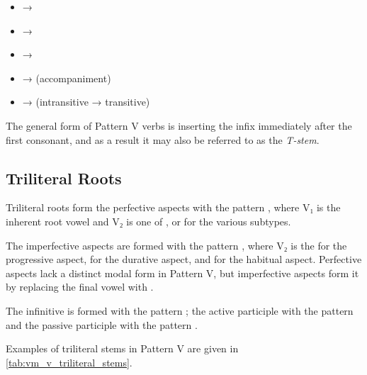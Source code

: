 \documentclass[grammar]{subfiles}
\begin{document}
\begin{itemize}
  \item {} → 
  \item {} → 
  \item {} → 
  \item {} →  (accompaniment)
  \item {} →  (intransitive → transitive)
\end{itemize}

The general form of Pattern V verbs is inserting the infix  immediately
after the first consonant, and as a result it may also be referred to as the \emph{T-stem}. 


\subsection{Triliteral Roots}
\label{ssec:vm_v_triliteral_roots}

Triliteral roots form the perfective aspects with the pattern
, where V₁ is the inherent root vowel and V₂ is one of ,
 or  for the various subtypes.  

The imperfective aspects are formed with the pattern , where
V₂ is the  for the progressive aspect,  for the durative aspect,
and  for the habitual aspect.  Perfective aspects lack a distinct modal
form in Pattern V, but imperfective aspects form it by replacing the final
vowel with . 

The infinitive is formed with the pattern ; the active
participle with the pattern  and the passive participle with the
pattern . 

Examples of triliteral stems in Pattern V are given in
\cref{tab:vm_v_triliteral_stems}. 
\end{document}
